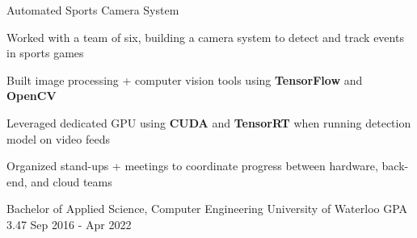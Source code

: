 \documentclass[11pt, a4paper]{awesome-cv}
\begin{document}
\begin{siderules2}
\begin{cventries}
    \cventry
        {\textit{}}
        {Automated Sports Camera System}
        {}
        {}
        {
          \begin{cvitems}
            \item {Worked with a team of six, building a camera system to detect and track events in sports games}
            \item {Built image processing + computer vision tools using \textbf{TensorFlow} and \textbf{OpenCV}}
            \item {Leveraged dedicated GPU using \textbf{CUDA} and \textbf{TensorRT} when running detection model on video feeds}
            \item {Organized stand-ups + meetings to coordinate progress between hardware, back-end, and cloud teams}
          \end{cvitems}
        }
\end{cventries}
\end{siderules2}
\begin{siderules3}
\begin{cventries}
    \education
    {\fontsize{11pt}{1.3em}\bodyfont\upshape\color{text}\selectfont Bachelor of Applied Science, Computer Engineering}
    {University of Waterloo}
    {GPA 3.47}
    {Sep 2016 - Apr 2022}
    {
      \begin{cvitems}
      \end{cvitems}
    }
\end{cventries}
\end{siderules3}
\end{document}
